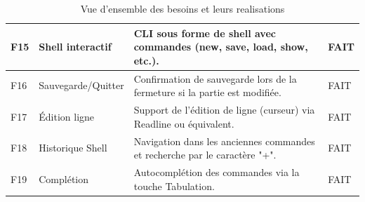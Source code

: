 \documentclass[a4paper]{article}
\begin{document}
\begin{table}[H]
\begin{tabular}{|p{1.5cm}|p{3cm}|p{8.5cm}|p{2cm}|}
        \hline
        F15 & Shell interactif & CLI sous forme de shell avec commandes (new, save, load, show, etc.). & FAIT \\
        \hline
        F16 & Sauvegarde/Quitter & Confirmation de sauvegarde lors de la fermeture si la partie est modifiée. & FAIT \\
        \hline
        F17 & Édition ligne & Support de l'édition de ligne (curseur) via Readline ou équivalent. & FAIT \\
        \hline
        F18 & Historique Shell & Navigation dans les anciennes commandes et recherche par le caractère "+". & FAIT \\
        \hline
        F19 & Complétion & Autocomplétion des commandes via la touche Tabulation. & FAIT \\
        \hline
    \end{tabular}
    \caption{Vue d'ensemble des besoins et leurs realisations}
    \label{tab:besoins4colonnes0}
\end{table}
\end{document}
